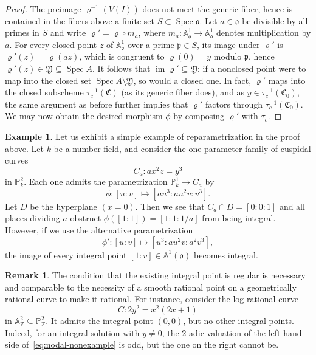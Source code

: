 \documentclass[a4paper, twoside, 11pt]{amsart}
\theoremstyle{definition}
\newtheorem{example}[theorem]{Example}
\newtheorem{remark}[theorem]{Remark}
\newcommand{\mC}{\mathfrak{C}}
\newcommand{\mY}{\mathfrak{Y}}
\newcommand{\fo}{\mathfrak{o}}
\newcommand{\fp}{\mathfrak{p}}
\newcommand{\dA}{\mathbb{A}}
\newcommand{\PP}{\mathbb{P}}
\newcommand{\ZZ}{\mathbb{Z}}
\DeclareMathOperator{\im}{im}
\DeclareMathOperator{\Spec}{Spec}
\begin{document}
\begin{proof}
	The preimage $\varrho^{-1}(V(I))$ does not meet the generic fiber, hence is contained in the fibers above a finite set $S\subset\Spec\fo$. Let $a\in \fo$ be divisible by all primes in $S$ and write $\varrho' = \varrho\circ m_a$, where $m_a\colon \dA_{\fo}^1 \to \dA_{\fo}^1$ denotes multiplication by $a$. For every closed point $z$ of $\dA^1_\fo$ over a prime $\fp\in S$, its image under $\varrho'$ is
	$\varrho'(z) = \varrho(az)$, which is congruent to $\varrho(0) = y$ modulo $\fp$, hence $\varrho'(z)\in \mY\subseteq \Spec A$. It follows that $\im\varrho' \subseteq \mY$: if a nonclosed point were to map into the closed set $\Spec A \setminus \mY$, so would a closed one. In fact, $\varrho'$ maps into the closed subscheme $\tau_c^{-1}(\mC)$ (as its generic fiber does), and as $y\in \tau_c^{-1}(\mC_0)$, the same argument as before further implies that $\varrho'$ factors through $\tau_c^{-1}(\mC_0)$. We may now obtain the desired morphism $\phi$ by composing $\varrho'$ with $\tau_c$.
\end{proof}
    
\begin{example}
        Let us exhibit a simple example of reparametrization in the proof above. Let $k$ be a number field, and consider the one-parameter family of cuspidal curves
		\begin{equation*}
			C_a\colon ax^2z=y^3
		\end{equation*}
		in $\PP^2_k$. Each one admits the parametrization $\PP_k^1\to C_a$ by
		\begin{equation*}
			\phi\colon [u:v]\mapsto [au^3:au^2v:v^3].
		\end{equation*}
		Let $D$ be the hyperplane $(x=0)$. Then we see that $C_a\cap D=[0:0:1]$ and all places dividing $a$ obstruct $\phi([1:1])= [1:1:1/a]$ from being integral. However, if we use the alternative parametrization
		\begin{equation*}
			\phi'\colon [u:v]\mapsto [u^3:au^2v:a^2v^3],
		\end{equation*}
		the image of every integral point $[1:v]\in \dA^1(\fo)$ becomes integral. 
    \end{example}

\begin{remark}
	The condition that the existing integral point is regular is necessary and comparable to the necessity of a smooth rational point on a geometrically rational curve to make it rational. For instance, consider the log rational curve
	\begin{equation}\label{eq:nodal-nonexample}
		C\colon 2y^2 = x^2\left(2x+1\right)
	\end{equation}
	in $\dA^2_\ZZ\subseteq\PP^2_\ZZ$. It admits the integral point $(0,0)$, but no other integral points. Indeed, for an integral solution with $y\ne 0$, the $2$-adic valuation of the left-hand side of~\eqref{eq:nodal-nonexample} is odd, but the one on the right cannot be.
\end{remark}
\end{document}
